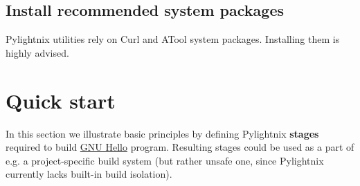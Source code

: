 \documentclass{article}
\begin{document}
\subsection{Install recommended system packages}

Pylightnix utilities rely on Curl and ATool system packages. Installing them
is highly advised.



\section{Quick start}

In this section we illustrate basic principles by defining Pylightnix
\textbf{stages} required to build \href{https://www.gnu.org/software/hello/}{GNU
Hello} program. Resulting stages could be used as a part of e.g. a
project-specific build system (but rather unsafe one, since Pylightnix currently
lacks built-in build isolation).
\end{document}
